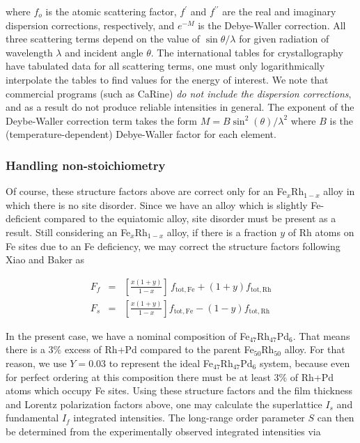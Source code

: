 \documentclass[aps,amsmath,amssymb,prb,superscriptaddress,longtable,preprint,fleqn]{revtex4}
\begin{document}
\noindent where $f_o$ is the atomic scattering factor, $f^\prime$ and $f^{\prime\prime}$ are the real and imaginary dispersion corrections, respectively, and $e^{-M}$ is the Debye-Waller correction.\cite{warren69,cullity01} All three scattering terms depend on the value of $\sin{\theta}/\lambda$ for given radiation of wavelength $\lambda$ and incident angle $\theta$. The international tables for crystallography have tabulated data for all scattering terms, one must only logarithmically interpolate the tables to find values for the energy of interest.  We note that commercial programs (such as CaRine) {\em do not include the dispersion corrections}, and as a result do not produce reliable intensities in general. The exponent of the Deybe-Waller correction term takes the form $M\!=\!B\sin^2{(\theta)}/\lambda^2$ where $B$ is the (temperature-dependent) Debye-Waller factor for each element.\cite{warren69,xiao95} \\

\subsubsection{Handling non-stoichiometry}

Of course, these structure factors above are correct only for an Fe$_x$Rh$_{1-x}$ alloy in which there is no site disorder. Since we have an alloy which is slightly Fe-deficient compared to the equiatomic alloy, site disorder must be present as a result. Still considering an Fe$_x$Rh$_{1-x}$ alloy, if there is a fraction $y$ of Rh atoms on Fe sites due to an Fe deficiency, we may correct the structure factors following Xiao and Baker\cite{xiao94} as

\begin{eqnarray}
F_f &=&\left[ \frac{x \left(1+y\right)}{1-x}\right] \, f_{\mathrm{tot, Fe}}+\left(1+y\right)f_{\mathrm{tot, Rh}} \\
F_s &=&   \left[\frac{x\left(1+y\right)}{1-x} \right]f_{\mathrm{tot, Fe}} - \left(1-y\right) f_{\mathrm{tot, Rh}} 
\end{eqnarray}

In the present case, we have a nominal composition of Fe$_{47}$Rh$_{47}$Pd$_{6}$. That means there is a $3\%$ excess of Rh+Pd compared to the parent Fe$_{50}$Rh$_{50}$ alloy. For that reason, we use $Y\!=\!0.03$ to represent the ideal  Fe$_{47}$Rh$_{47}$Pd$_{6}$ system, because even for perfect ordering at this composition there must be at least $3\%$ of Rh+Pd atoms which occupy Fe sites.\cite{xiao94,xiao95} Using these structure factors and the film thickness and Lorentz polarization factors above, one may calculate the superlattice $I_s$ and fundamental $I_f$ integrated intensities. The long-range order parameter $S$ can then be determined from the experimentally observed integrated intensities via\cite{warren69,lu09,xiao94,xiao95}
\end{document}

